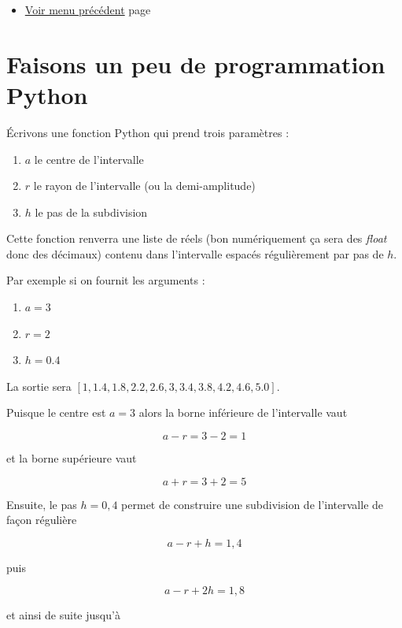 \documentclass[a4paper,11pt]{book}
\begin{document}
\begin{itemize}
\item \hyperref[orgb78d1c3]{Voir menu précédent}
page~\pageref{page:content4-menu}
\end{itemize}

\clearpage

\section{Faisons un peu de programmation Python}
\label{sec:orgc270635}
\label{orgac9e963}
\label{page:sec2.4.4python}

Écrivons une fonction Python qui prend trois paramètres :

\begin{enumerate}
\item \(a\) le centre de l'intervalle
\item \(r\) le rayon de l'intervalle (ou la demi-amplitude)
\item \(h\) le pas de la subdivision
\end{enumerate}


Cette fonction renverra une liste de réels (bon numériquement ça
sera des \emph{float} donc des décimaux) contenu dans
l'intervalle espacés régulièrement par pas de \(h\).

Par exemple si on fournit les arguments :

\begin{enumerate}
\item \(a = 3\)
\item \(r = 2\)
\item \(h = 0.4\)
\end{enumerate}

La sortie sera \([1, 1.4, 1.8, 2.2, 2.6, 3, 3.4, 3.8, 4.2, 4.6,
5.0]\).

Puisque le centre est \(a = 3\) alors la borne
inférieure de l'intervalle vaut

\[a - r = 3 - 2 = 1\]

et la borne supérieure vaut

\[a + r = 3 + 2 = 5\]

Ensuite, le pas \(h = 0,4\) permet de construire une subdivision de
l'intervalle de façon régulière

\[a - r + h = 1,4\]

puis

\[a - r + 2h = 1,8\]

et ainsi de suite jusqu'à
\end{document}
